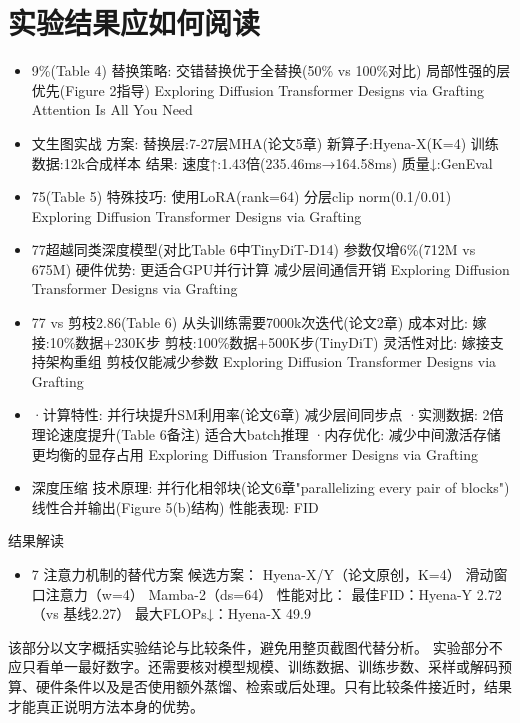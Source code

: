 \documentclass[UTF8,11pt,a4paper]{ctexart}
\begin{document}
\section{实验结果应如何阅读}
\begin{itemize}
\item 9\%(Table 4) 替换策略: 交错替换优于全替换(50\% vs 100\%对比) 局部性强的层优先(Figure 2指导) Exploring Diffusion Transformer Designs via Grafting Attention Is All You Need
\item 文生图实战 方案: 替换层:7-27层MHA(论文5章) 新算子:Hyena-X(K=4) 训练数据:12k合成样本 结果: 速度↑:1.43倍(235.46ms→164.58ms) 质量↓:GenEval
\item 75(Table 5) 特殊技巧: 使用LoRA(rank=64) 分层clip norm(0.1/0.01) Exploring Diffusion Transformer Designs via Grafting
\item 77超越同类深度模型(对比Table 6中TinyDiT-D14) 参数仅增6\%(712M vs 675M) 硬件优势: 更适合GPU并行计算 减少层间通信开销 Exploring Diffusion Transformer Designs via Grafting
\item 77 vs 剪枝2.86(Table 6) 从头训练需要7000k次迭代(论文2章) 成本对比: 嫁接:10\%数据+230K步 剪枝:100\%数据+500K步(TinyDiT) 灵活性对比: 嫁接支持架构重组 剪枝仅能减少参数 Exploring Diffusion Transformer Designs via Grafting
\item ·计算特性: 并行块提升SM利用率(论文6章) 减少层间同步点 ·实测数据: 2倍理论速度提升(Table 6备注) 适合大batch推理 ·内存优化: 减少中间激活存储 更均衡的显存占用 Exploring Diffusion Transformer Designs via Grafting
\item 深度压缩 技术原理: 并行化相邻块(论文6章"parallelizing every pair of blocks") 线性合并输出(Figure 5(b)结构) 性能表现: FID
\end{itemize}

\begin{notebox}{结果解读}
\begin{itemize}
\item 7 注意力机制的替代方案 候选方案： Hyena-X/Y（论文原创，K=4） 滑动窗口注意力（w=4） Mamba-2（ds=64） 性能对比： 最佳FID：Hyena-Y 2.72（vs 基线2.27） 最大FLOPs↓：Hyena-X 49.9\\%
\end{itemize}
\end{notebox}

该部分以文字概括实验结论与比较条件，避免用整页截图代替分析。
实验部分不应只看单一最好数字。还需要核对模型规模、训练数据、训练步数、采样或解码预算、硬件条件以及是否使用额外蒸馏、检索或后处理。只有比较条件接近时，结果才能真正说明方法本身的优势。
\end{document}
